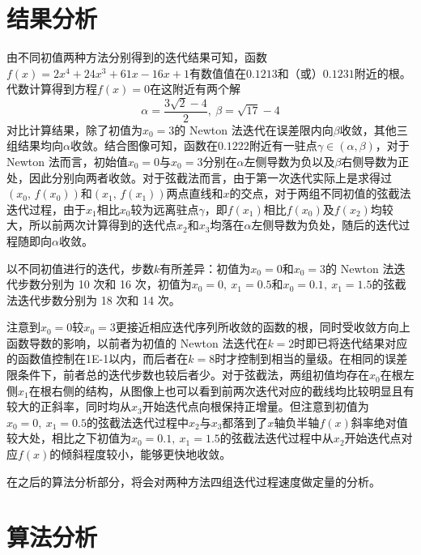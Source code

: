 \documentclass[11pt]{article}
\begin{document}
\section{结果分析}
由不同初值两种方法分别得到的迭代结果可知，函数$f(x) = 2x^4 + 24x^3 + 61x - 16x + 1$有数值值在$0.1213$和（或）$0.1231$附近的根。代数计算得到方程$f(x) = 0$在这附近有两个解
$$
    \alpha = \frac{3 \sqrt{2} - 4}{2},\ \beta = \sqrt{17} - 4
$$
对比计算结果，除了初值为$x_0 = 3$的 Newton 法迭代在误差限内向$\beta$收敛，其他三组结果均向$\alpha$收敛。结合图像可知，函数在$0.1222$附近有一驻点$\gamma \in (\alpha, \beta)$，对于 Newton 法而言，初始值$x_0 = 0$与$x_0 = 3$分别在$\alpha$左侧导数为负以及$\beta$右侧导数为正处，因此分别向两者收敛。对于弦截法而言，由于第一次迭代实际上是求得过$(x_0,\, f(x_0))$和$(x_1,\, f(x_1))$两点直线和$x$的交点，对于两组不同初值的弦截法迭代过程，由于$x_1$相比$x_0$较为远离驻点$\gamma$，即$f(x_1)$相比$f(x_0)$及$f(x_2)$均较大，所以前两次计算得到的迭代点$x_2$和$x_3$均落在$\alpha$左侧导数为负处，随后的迭代过程随即向$\alpha$收敛。

以不同初值进行的迭代，步数$k$有所差异：初值为$x_0 = 0$和$x_0 = 3$的 Newton 法迭代步数分别为 10 次和 16 次，初值为$x_0 = 0,\ x_1 = 0.5$和$x_0 = 0.1,\ x_1 = 1.5$的弦截法迭代步数分别为 18 次和 14 次。

注意到$x_0 = 0$较$x_0 = 3$更接近相应迭代序列所收敛的函数的根，同时受收敛方向上函数导数的影响，以前者为初值的 Newton 法迭代在$k = 2$时即已将迭代结果对应的函数值控制在\num{1E-1}以内，而后者在$k = 8$时才控制到相当的量级。在相同的误差限条件下，前者总的迭代步数也较后者少。对于弦截法，两组初值均存在$x_0$在根左侧$x_1$在根右侧的结构，从图像上也可以看到前两次迭代对应的截线均比较明显且有较大的正斜率，同时均从$x_3$开始迭代点向根保持正增量。但注意到初值为$x_0 = 0,\ x_1 = 0.5$的弦截法迭代过程中$x_2$与$x_3$都落到了$x$轴负半轴$f(x)$斜率绝对值较大处，相比之下初值为$x_0 = 0.1,\ x_1 = 1.5$的弦截法迭代过程中从$x_2$开始迭代点对应$f(x)$的倾斜程度较小，能够更快地收敛。

在之后的算法分析部分，将会对两种方法四组迭代过程速度做定量的分析。

\section{算法分析}
\end{document}
